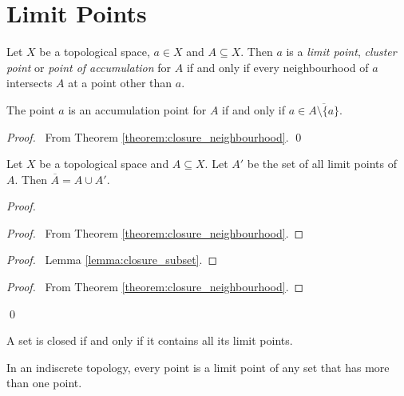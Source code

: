\section{Limit Points}

\begin{definition}
    Let $X$ be a topological space, $a \in X$ and $A \subseteq X$. Then $a$ is a \emph{limit point},
    \emph{cluster point} or \emph{point of accumulation} for $A$ if and only if every neighbourhood of $a$
    intersects $A$ at a point other than $a$.
\end{definition}

\begin{lemma}
    The point $a$ is an accumulation point for $A$ if and only if $a \in \overline{A \setminus \{a\}}$.
\end{lemma}

\begin{proof}
    \pf\ From Theorem \ref{theorem:closure_neighbourhood}. \qed
\end{proof}

\begin{theorem}
    \label{theorem:limit_point_closure}
    Let $X$ be a topological space and $A \subseteq X$. Let $A'$ be the set of all limit points of $A$.
    Then $\overline{A} = A \cup A'$.
\end{theorem}

\begin{proof}
    \pf
    \begin{proof}
        \pf\ From Theorem \ref{theorem:closure_neighbourhood}.
    \end{proof}
    \begin{proof}
        \pf\ Lemma \ref{lemma:closure_subset}.
    \end{proof}
    \begin{proof}
        \pf\ From Theorem \ref{theorem:closure_neighbourhood}.
    \end{proof}
    \qed
\end{proof}

\begin{corollary}
    \label{corollary:closed_limit_point}
    A set is closed if and only if it contains all its limit points.
\end{corollary}

\begin{proposition}
    \label{proposition:indiscrete_limit_point}
    In an indiscrete topology, every point is a limit point of any set that has more than one point.
\end{proposition}

